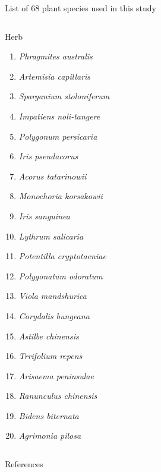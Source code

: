 \begin{frame}[shrink]{List of 68 plant species used in this study}
\begin{columns}[T,onlytextwidth]
	\begin{exampleblock}{Herb}		
		\begin{enumerate}			
			\item \emph{Phragmites australis} \item \emph{Artemisia capillaris} \item \emph{Sparganium stoloniferum}
			\item \emph{Impatiens noli-tangere} \item \emph{Polygonum persicaria} \item \emph{Iris pseudacorus}
			\item \emph{Acorus tatarinowii} \item \emph{Monochoria korsakowii} \item \emph{Iris sanguinea}
			\item \emph{Lythrum salicaria}
			\item \emph{Potentilla cryptotaeniae}	\item \emph{Polygonatum odoratum} \item \emph{Viola mandshurica}
			\item \emph{Corydalis bungeana}	\item \emph{Astilbe chinensis} \item \emph{Trrifolium repens}
			\item \emph{Arisaema peninsulae}	\item \emph{Ranunculus chinensis} \item \emph{Bidens biternata}
			\item \emph{Agrimonia pilosa}
		\end{enumerate}	
	\end{exampleblock}	
\end{columns}

\end{frame}

\begin{frame}[t,allowframebreaks]{References}
  
%  
  
\end{frame}